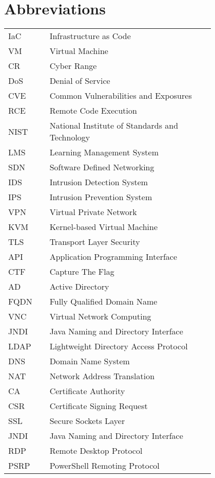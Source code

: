 \chapter*{Abbreviations}

\begin{flushleft}
\begin{tabular}{l p{0.8\linewidth}}
IaC      & Infrastructure as Code\\
VM       & Virtual Machine\\
CR       & Cyber Range\\
DoS      & Denial of Service\\
CVE      & Common Vulnerabilities and Exposures\\
RCE      & Remote Code Execution\\
NIST     & National Institute of Standards and Technology\\
LMS      & Learning Management System\\
SDN      & Software Defined Networking\\
IDS      & Intrusion Detection System\\
IPS      & Intrusion Prevention System\\
VPN      & Virtual Private Network\\
KVM      & Kernel-based Virtual Machine\\
TLS      & Transport Layer Security\\
API      & Application Programming Interface\\
CTF      & Capture The Flag\\
AD       & Active Directory\\
FQDN     & Fully Qualified Domain Name\\
VNC      & Virtual Network Computing\\
JNDI     & Java Naming and Directory Interface\\
LDAP     & Lightweight Directory Access Protocol\\
DNS      & Domain Name System\\
NAT      & Network Address Translation\\
CA       & Certificate Authority\\
CSR      & Certificate Signing Request\\
SSL      & Secure Sockets Layer\\
JNDI     & Java Naming and Directory Interface\\
RDP      & Remote Desktop Protocol\\
PSRP     & PowerShell Remoting Protocol\\

\end{tabular}
\end{flushleft}
